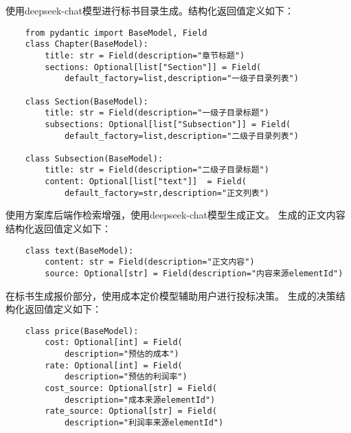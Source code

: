 \documentclass{xmu}
\begin{document}
    使用deepseek-chat模型进行标书目录生成。结构化返回值定义如下：
    \begin{verbatim}
    from pydantic import BaseModel, Field
    class Chapter(BaseModel):
        title: str = Field(description="章节标题")
        sections: Optional[list["Section"]] = Field(
            default_factory=list,description="一级子目录列表")
    
    class Section(BaseModel):
        title: str = Field(description="一级子目录标题")
        subsections: Optional[list["Subsection"]] = Field(
            default_factory=list,description="二级子目录列表")
        
    class Subsection(BaseModel):
        title: str = Field(description="二级子目录标题")
        content: Optional[list["text"]]  = Field(
            default_factory=str,description="正文列表")
    \end{verbatim}


    使用方案库后端作检索增强，使用deepseek-chat模型生成正文。
    生成的正文内容结构化返回值定义如下：
    \begin{verbatim}
    class text(BaseModel):
        content: str = Field(description="正文内容")
        source: Optional[str] = Field(description="内容来源elementId")
    \end{verbatim}


    在标书生成报价部分，使用成本定价模型辅助用户进行投标决策。
    生成的决策结构化返回值定义如下：
    \begin{verbatim}
    class price(BaseModel):
        cost: Optional[int] = Field(
            description="预估的成本")
        rate: Optional[int] = Field(
            description="预估的利润率")
        cost_source: Optional[str] = Field(
            description="成本来源elementId")
        rate_source: Optional[str] = Field(
            description="利润率来源elementId")
    \end{verbatim}
\end{document}
